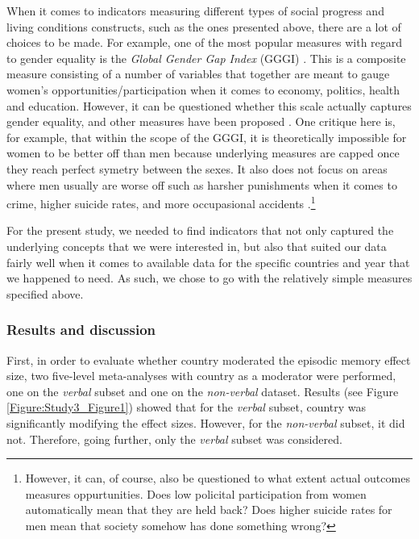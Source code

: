 When it comes to indicators measuring different types of social progress and living conditions constructs, such as the ones presented above, there are a lot of choices to be made. For example, one of the most popular measures with regard to gender equality is the \emph{Global Gender Gap Index} (GGGI) \parencite{WEF2020}. This is a composite measure consisting of a number of variables that together are meant to gauge women's opportunities/participation when it comes to economy, politics, health and education. However, it can be questioned whether this scale actually captures gender equality, and other measures have been proposed \parencite{Stoet2019}. One critique here is, for example, that within the scope of the GGGI, it is theoretically impossible for women to be better off than men because underlying measures are capped once they reach perfect symetry between the sexes. It also does not focus on areas where men usually are worse off such as harsher punishments when it comes to crime, higher suicide rates, and more occupasional accidents \parencite{Stoet2019}.\footnote{However, it can, of course, also be questioned to what extent actual outcomes measures oppurtunities. Does low policital participation from women automatically mean that they are held back? Does higher suicide rates for men mean that society somehow has done something wrong?}

For the present study, we needed to find indicators that not only captured the underlying concepts that we were interested in, but also that suited our data fairly well when it comes to available data for the specific countries and year that we happened to need. As such, we chose to go with the relatively simple measures specified above.

\subsubsection{Results and discussion}

First, in order to evaluate whether country moderated the episodic memory effect size, two five-level meta-analyses with country as a moderator were performed, one on the \emph{verbal} subset and one on the \emph{non-verbal} dataset. Results (see Figure \ref{Figure:Study3_Figure1}) showed that for the \emph{verbal} subset, country was significantly modifying the effect sizes. However, for the \emph{non-verbal} subset, it did not. Therefore, going further, only the \emph{verbal} subset was considered.

